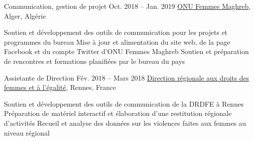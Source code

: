 \begin{joblist}

\item[Communication, gestion de projet]{Oct. 2018 -- Jan. 2019 }     
	{
	\href{http://maghreb.unwomen.org/fr}{ONU Femmes Maghreb}, Alger, Algérie
	}     
	{
			 
		\vspace{-0.5cm}
		\begin{itemize}
			  \iftbftiny \setlength\itemsep{-3pt} \fi
			  \cvitem[\checkmark] Soutien et développement des outils de communication pour les projets et programmes du bureau      
 			  \cvitem[\checkmark] Mise à jour et alimentation du site web, de la page Facebook et du compte Twitter d’ONU Femmes Maghreb                                                            
			  \cvitem[\checkmark] Soutien et préparation de rencontres et formations planifiées par le bureau du pays
		\end{itemize}      

	}


\item[Assistante de Direction]{Fév. 2018 -- Mars 2018 }     
	{
	\href{https://www.egalite-femmes-hommes.gouv.fr/le-secretariat-d-etat/organisation-du-ministere/services-territoriaux/annuaire-des-equipes-regionales-et-departementales/}{Direction régionale aux droits des femmes et à l'égalité}, Rennes, France
	}     
	{
			 
		\iftbftiny \vspace{-0.5cm} \fi
		\begin{itemize}
			  \iftbftiny \setlength\itemsep{-3pt} \fi
			  \cvitem[\checkmark] Soutien et développement des outils de communication de la DRDFE à Rennes      
			  \cvitem[\checkmark] Préparation de matériel interactif et élaboration d'une restitution régionale d'activités
			  \cvitem[\checkmark] Recueil et analyse des données sur les violences faites aux femmes au niveau régional
		\end{itemize}      

}
\end{joblist}
